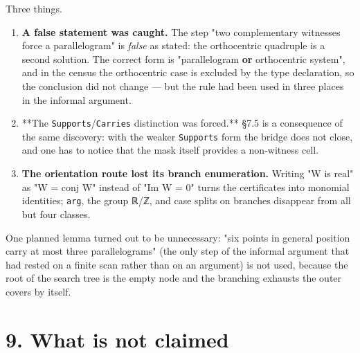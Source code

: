 \documentclass[11pt,a4paper]{article}
\theoremstyle{named}
\begin{document}
Three things.

\begin{enumerate}[leftmargin=1.4em,itemsep=.2em,topsep=.3em]
\item \textbf{A false statement was caught.} The step "two complementary witnesses force a parallelogram" is \textit{false} as stated: the orthocentric quadruple is a second solution. The correct form is "parallelogram \textbf{or} orthocentric system", and in the census the orthocentric case is excluded by the type declaration, so the conclusion did not change — but the rule had been used in three places in the informal argument.
\item **The \texttt{Supports}/\texttt{Carries} distinction was forced.** §7.5 is a consequence of the same discovery: with the weaker \texttt{Supports} form the bridge does not close, and one has to notice that the mask itself provides a non-witness cell.
\item \textbf{The orientation route lost its branch enumeration.} Writing "W is real" as "W = conj W" instead of "Im W = 0" turns the certificates into monomial identities; \texttt{arg}, the group ℝ/ℤ, and case splits on branches disappear from all but four classes.
\end{enumerate}

One planned lemma turned out to be unnecessary: "six points in general position carry at most three parallelograms" (the only step of the informal argument that had rested on a finite scan rather than on an argument) is not used, because the root of the search tree is the empty node and the branching exhausts the outer covers by itself.

\section*{9. What is not claimed}
\end{document}
